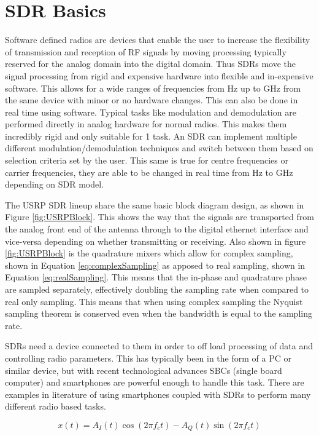 \section{SDR Basics} \label{sec:SDRBasics}
Software defined radios are devices that enable the user to increase the flexibility of transmission and reception of RF signals by moving processing typically reserved
for the analog domain into the digital domain. Thus SDRs move the signal processing from rigid and expensive hardware into flexible and in-expensive software. This
allows for a wide ranges of frequencies from Hz up to GHz from the same device with minor or no hardware changes. This can also be done in real time using software.
Typical tasks like modulation and demodulation are performed directly in analog hardware for normal radios. This makes them incredibly rigid and only suitable for 1 task.
An SDR can implement multiple different modulation/demodulation techniques and switch between them based on selection criteria set by the user. This same is true for
centre frequencies or carrier frequencies, they are able to be changed in real time from Hz to GHz depending on SDR model.

The USRP SDR lineup share the same basic block diagram design, as shown in Figure \ref{fig:USRPBlock}. This shows the way that the signals are transported from the analog
front end of the antenna through to the digital ethernet interface and vice-versa depending on whether transmitting or receiving. Also shown in figure \ref{fig:USRPBlock} is the
quadrature mixers which allow for complex sampling, shown in Equation \ref{eq:complexSampling} as apposed to real sampling, shown in Equation \ref{eq:realSampling}. This means that the in-phase and quadrature phase are sampled separately, effectively
doubling the sampling rate when compared to real only sampling. This means that when using complex sampling the Nyquist sampling theorem is conserved even when the
bandwidth is equal to the sampling rate.

SDRs need a device connected to them in order to off load processing of data and controlling radio parameters. This has typically been in the form of a PC or similar
device, but with recent technological advances SBCs (single board computer) and smartphones are powerful enough to handle this task. There are examples in literature of
using smartphones coupled with SDRs to perform many different radio based tasks.

\begin{equation} \label{eq:complexSampling}
    x\left(t\right) = A_{I}\left(t\right)\cos\left(2\pi f_{c}t\right) - A_{Q}\left(t\right)\sin\left(2\pi f_{c}t\right)
\end{equation}

